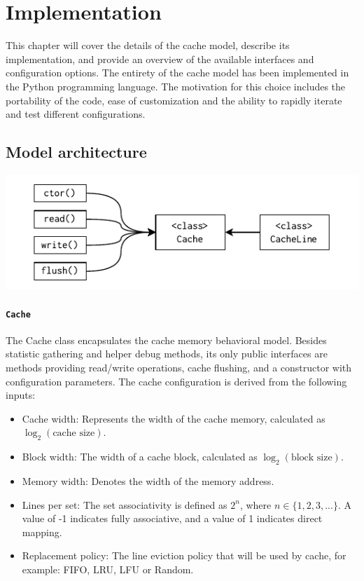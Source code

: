 
\chapter{Implementation}

This chapter will cover the details of the cache model, describe its implementation, and provide an overview of the available interfaces and configuration options.
The entirety of the cache model has been implemented in the Python programming language. The motivation for this choice includes the portability of the code, ease of customization and
the ability to rapidly iterate and test different configurations.

\section{Model architecture}

\begin{center}
	\centering
	\includegraphics[width=\textwidth]{figures/04-implementation/cache_mdl_arch.pdf}
	\label{fig:cache_mdl_arch}
\end{center}

\subsubsection{\texttt{Cache}} \label{sec:cache_model}

The Cache class encapsulates the cache memory behavioral model. Besides statistic gathering and helper debug methods, its only public interfaces are methods
providing read/write operations, cache flushing, and a constructor with configuration parameters. The cache configuration is derived from the following inputs:
\begin{itemize}
    \item Cache width: Represents the width of the cache memory, calculated as \(\log_2(\text{cache size})\).
    \item Block width: The width of a cache block, calculated as \(\log_2(\text{block size})\).
    \item Memory width: Denotes the width of the memory address.
    \item Lines per set: The set associativity is defined as $2^n$, where $n \in \{1, 2, 3, ...\}$. A value of -1 indicates fully associative, and a value of 1 indicates direct mapping.
	\item Replacement policy: The line eviction policy that will be used by cache, for example: FIFO, LRU, LFU or Random.
\end{itemize}

